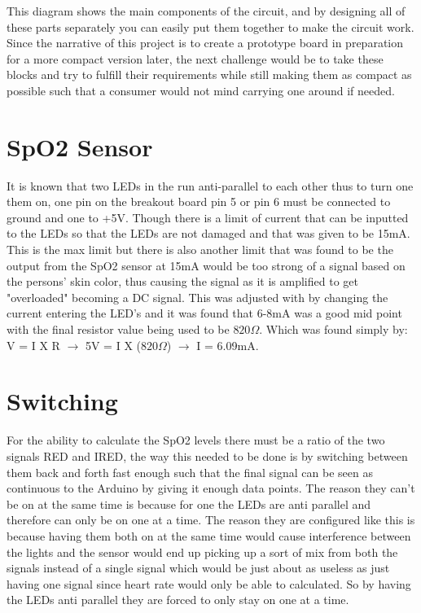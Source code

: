 \documentclass{article}
\begin{document}
This diagram shows the main components of the circuit, and by designing all of these parts separately you can easily put them together to make the circuit work. Since the narrative of this project is to create a prototype board in preparation for a more compact version later, the next challenge would be to take these blocks and try to fulfill their requirements while still making them as compact as possible such that a consumer would not mind carrying one around if needed.
\newpage
\section{SpO2 Sensor}
It is known that two LEDs in the run anti-parallel to each other thus to turn one them on, one pin on the breakout board pin 5 or pin 6 must be connected to ground and one to +5V. Though there is a limit of current that can be inputted to the LEDs so that the LEDs are not damaged and that was given to be 15mA. This is the max limit but there is also another limit that was found to be the output from the SpO2 sensor at 15mA would be too strong of a signal based on the persons' skin color, thus causing the signal as it is amplified to get "overloaded" becoming a DC signal. This was adjusted with by changing the current entering the LED's and it was found that 6-8mA was a good mid point with the final resistor value being used to be $820\Omega$. Which was found simply by: V = I X R $\rightarrow$ 5V = I X ($820\Omega$) $\rightarrow$ I = 6.09mA.

\section{Switching}
For the ability to calculate the SpO2 levels there must be a ratio of the two signals RED and IRED, the way this needed to be done is by switching between them back and forth fast enough such that the final signal can be seen as continuous to the Arduino by giving it enough data points. The reason they can't be on at the same time is because for one the LEDs are anti parallel and therefore can only be on one at a time. The reason they are configured like this is because having them both on at the same time would cause interference between the lights and the sensor would end up picking up a sort of mix from both the signals instead of a single signal which would be just about as useless as just having one signal since heart rate would only be able to calculated. So by having the LEDs anti parallel they are forced to only stay on one at a time.
\end{document}
